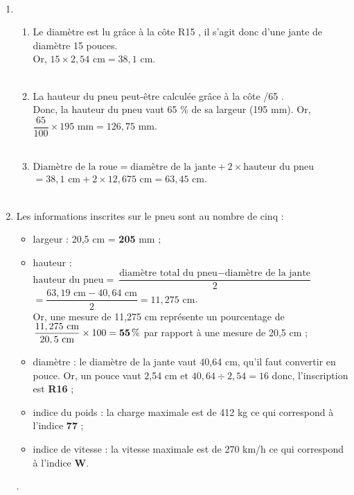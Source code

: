 \ \\ [-5mm]
\begin{enumerate}
   \item
   \begin{enumerate}
      \item Le diamètre est lu grâce à la côte \og R15 \fg, il s'agit donc d'une jante de diamètre 15 pouces. \\
      Or, $15\times2,54\text{ cm} =38,1\text{ cm}$. \\
       \\
      \item La hauteur du pneu peut-être calculée grâce à la côte /65 \fg. \\
      Donc, la hauteur du pneu vaut 65 \% de sa largeur (195 mm). Or, $\dfrac{65}{100}\times195\text{ mm} =126,75\text{ mm}$. \\
       \\
      \item $\text{Diamètre de la roue} = \text{diamètre de la jante} + 2\times\text{hauteur du pneu}$ \\
      \hspace*{3.38cm} $= 38,1\text{ cm} + 2\times12,675\text{ cm}=63,45\text{ cm}$. \\
       \\
   \end{enumerate}
   \item Les informations inscrites sur le pneu sont au nombre de cinq :
   \begin{itemize}
      \item largeur : 20,5 cm = {\bf 205} mm ;
      \item hauteur : $\text{hauteur du pneu} = \dfrac{\text{diamètre total du pneu}-\text{diamètre de la jante}}{2}$ \\ [1mm]
      \hspace*{4.7cm} $=\dfrac{63,19\text{ cm}-40,64\text{ cm}}{2} =11,275\text{ cm}$. \\ [1mm]
      Or, une mesure de 11,275 cm représente un pourcentage de $\dfrac{11,275\text{ cm}}{20,5\text{ cm}}\times100 =\bf{55}\,\%$ par rapport à une mesure de 20,5 cm ;
      \item diamètre : le diamètre de la jante vaut 40,64 cm, qu'il faut convertir en pouce. Or, un pouce vaut 2,54 cm et $40,64\div2,54=16$ donc, l'inscription est {\bf R16} ;
      \item indice du poids : la charge maximale est de 412 kg ce qui correspond à l'indice {\bf 77} ;
      \item indice de vitesse : la vitesse maximale est de 270 km/h ce qui correspond à l'indice {\bf W}. \\
   \end{itemize}
   .
\end{enumerate}
